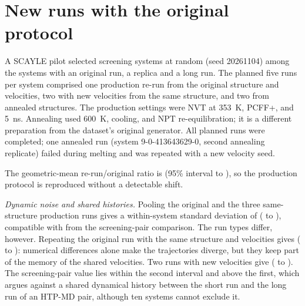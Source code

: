 \documentclass[11pt]{article}
\begin{document}
\begin{table}[!htbp]
\centering\small
\caption{Exploratory aggregation associations (\solvN{} long runs). Entries are Spearman
correlations with 95\% bootstrap intervals; partial correlations control for long-run mobility.
Intervals spanning zero limit mechanistic interpretation.}\label{si:tab:solvation}

\end{table}

\section{New runs with the original protocol}\label{si:sec:pilot}
A SCAYLE pilot selected \pilN{} screening systems at random (seed 20261104) among the systems
with an original run, a replica and a long run. The planned five runs per system comprised one
production re-run from the original structure and velocities, two with new velocities from the
same structure, and two from annealed structures. The production settings were NVT at
\SI{353}{\kelvin}, PCFF+, and \SI{5}{\nano\second}. Annealing used \SI{600}{\kelvin}, cooling,
and NPT re-equilibration; it is a different preparation from the dataset's original generator.
All \pilRuns{} planned runs were completed; one annealed run (system 9-0-413643629-0,
second annealing replicate) failed during melting and was repeated with a new velocity seed.

The geometric-mean re-run/original ratio is \pilRepShift{} (95\% interval \pilRepShiftLo{} to
\pilRepShiftHi), so the production protocol is reproduced without a detectable shift.

\emph{Dynamic noise and shared histories.} Pooling the original and the three same-structure
production runs gives a within-system standard deviation of \pilSdDyn{} (\pilSdDynLo{} to
\pilSdDynHi), compatible with \techoEndSdDyn{} from the screening-pair comparison. The run types
differ, however. Repeating the original run with the same structure and velocities gives
\pilSdExact{} (\pilSdExactLo{} to \pilSdExactHi): numerical differences alone make the
trajectories diverge, but they keep part of the memory of the shared velocities. Two runs with
new velocities give \pilSdNewVel{} (\pilSdNewVelLo{} to \pilSdNewVelHi). The screening-pair value
\techoEndSdDyn{} lies within the second interval and above the first, which argues against a
shared dynamical history between the short run and the long run of an HTP-MD pair, although ten
systems cannot exclude it.
\end{document}
